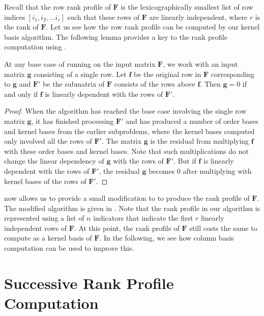 Recall that the row rank profile of $\mathbf{F}$ is the lexicographically
smallest list of row indices $\left[i_{1},i_{2},\dots i_{r}\right]$
such that these rows of $\mathbf{F}$ are linearly independent, where
$r$ is the rank of $\mathbf{F}$. Let us see how the row rank profile
can be computed by our kernel basis algorithm.  The following lemma
provides a key to the rank profile computation using .
\begin{lem}
\label{lem:rankProfileIndicator}At any base case of running 
on the input matrix\textbf{ $\mathbf{F}$}, we work with an input
matrix $\mathbf{g}$ consisting of a single row. Let $\mathbf{f}$
be the original row in $\mathbf{F}$ corresponding to $\mathbf{g}$
and $\mathbf{F}'$ be the submatrix of $\mathbf{F}$ consists of the
rows above $\mathbf{f}$. Then $\mathbf{g}=0$ if and only if $\mathbf{f}$
is linearly dependent with the rows of $\mathbf{F}'$.\end{lem}
\begin{proof}
When the algorithm has reached the base case involving the single
row matrix $\mathbf{g}$, it has finished processing $\mathbf{F}'$
and has produced a number of order bases and kernel bases from the
earlier subproblems, where the kernel bases computed only involved
all the rows of $\mathbf{F}'$. The matrix $\mathbf{g}$ is the residual
from multiplying $\mathbf{f}$ with these order bases and kernel bases.
Note that such multiplications do not change the linear dependency
of $\mathbf{g}$ with the rows of $\mathbf{F}'$. But if $\mathbf{f}$
is linearly dependent with the rows of $\mathbf{F}'$, the residual
$\mathbf{g}$ becomes 0 after multiplying with kernel bases of the
rows of $\mathbf{F}'$.
\end{proof}
 now allows us to provide a small
modification to  to produce
the rank profile of $\mathbf{F}$. The modified algorithm is given
in . Note that
the rank profile in our algorithm is represented using a list of $n$
indicators that indicate the first $r$ linearly independent rows
of $\mathbf{F}$. At this point, the rank profile of $\mathbf{F}$
still costs the same to compute as a kernel basis of $\mathbf{F}$.
In the following, we see how column basis computation can be used
to improve this.




\section{Successive Rank Profile Computation}

